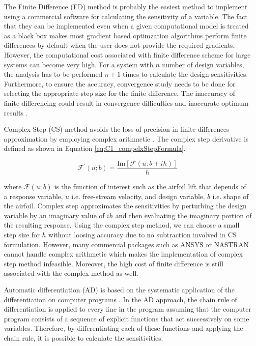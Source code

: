 The Finite Difference (FD) method is probably the easiest method to implement using a commercial software for calculating the sensitivity of a variable. The fact that they can be implemented even when a given computational model is treated as a black box makes most gradient based optimzation algorithms perform finite differences by default when the user does not provide the required gradients. However, the computational cost associated with finite difference scheme for large systems can become very high. For a system with $n$ number of design variables, the analysis has to be performed $n+1$ times to calculate the design sensitivities. Furthermore, to ensure the accuracy, convergence study needs to be done for selecting the appropriate step size for the finite difference. The inaccuracy of finite differencing could result in convergence difficulties and inaccurate optimum results \cite{sobieszczanski1997multidisciplinary}.

Complex Step (CS) method avoids the loss of precision in finite differences approximation by employing complex arithmetic \cite{martins2003complex}. The complex step derivative is defined as shown in Equation \eqref{eq:C1_compelxStepFormula}.

\begin{equation}\label{eq:C1_compelxStepFormula}
	\mathcal{F}^\prime\left(u; b\right) = \frac{\text{Im}\left[ \mathcal{F}\left(u; b + ih\right) \right]}{h}
\end{equation}

where $\mathcal{F}\left(u; b\right)$ is the function of interest such as the airfoil lift that depends of a response variable, $u$ i.e. free-stream velocity, and design variable, $b$ i.e. shape of the airfoil. Complex step approximates the sensitivities by perturbing the design variable by an imaginary value of $ih$ and then evaluating
the imaginary portion of the resulting response. Using the complex step method, we can choose a
small step size for $h$ without loosing accuracy due to no subtraction involved in CS formulation. However, many commercial packages such as ANSYS or NASTRAN cannot handle complex arithmetic which makes the implementation of complex step method infeasible. Moreover, the high cost of finite difference is still associated with the complex method as well.

Automatic differentiation (AD) is based on the systematic application of the differentiation on computer programs \cite{naumann2012art}. In the AD approach, the chain rule of differentiation is applied to every line in the program assuming that the computer program consists of a sequence of explicit functions that act successively on some variables. Therefore, by differentiating each of these functions and applying the chain rule, it is possible to calculate the sensitivities. 

